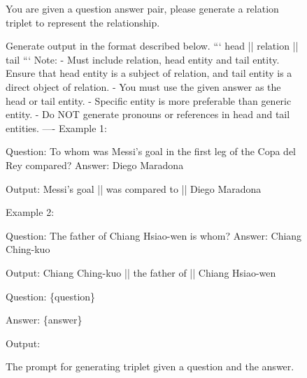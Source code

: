 \documentclass{article} %
\begin{document}
\begin{figure}[!ht]
\tiny
\begin{mdframed}

You are given a question answer pair, please generate a relation triplet to represent the relationship.

Generate output in the format described below.
```
head || relation || tail
```
Note:
- Must include relation, head entity and tail entity. Ensure that head entity is a subject of relation, and tail entity is a direct object of relation.
- You must use the given answer as the head or tail entity.
- Specific entity is more preferable than generic entity.
- Do NOT generate pronouns or references in head and tail entities.
----
Example 1:

Question: To whom was Messi's goal in the first leg of the Copa del Rey compared?
Answer: Diego Maradona

Output:
Messi's goal || was compared to || Diego Maradona

Example 2:

Question: The father of Chiang Hsiao-wen is whom?
Answer: Chiang Ching-kuo

Output:
Chiang Ching-kuo || the father of || Chiang Hsiao-wen


Question: \{question\}

Answer: \{answer\}

Output:
\end{mdframed}
\caption{The prompt for generating triplet given a question and the answer.}
\label{prompt-triplet}
\end{figure}
\end{document}
